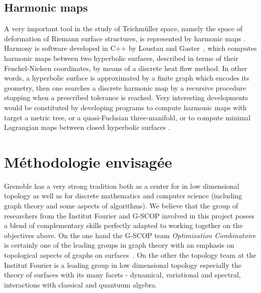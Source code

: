 \documentclass[14pt,fleqn]{article}
\begin{document}
\subsection{Harmonic maps}

A very important tool in the study of Teichm\" {u}ller space, namely the
space of deformation of Riemann surface structures, is represented by
harmonic maps \cite{wolf}. Harmony is  software developed in C++ by
Loustau and Gaster~\cite{glm-cdehm-18}, which computes harmonic maps between two
hyperbolic surfaces, described in terms of their Fenchel-Nielsen
coordinates, by means of a discrete heat flow method. In other words,
a hyperbolic surface is 
approximated by a finite graph 
which encodes its geometry, 
then one searches a discrete harmonic 
map by a  recursive procedure 
stopping when  a prescribed tolerance is reached. 
Very interesting developments would be
constituted by developing programs to compute harmonic maps with
target a metric tree, or a quasi-Fuchsian three-manifold, or to
compute minimal Lagrangian maps between closed hyperbolic surfaces \cite{BS}.


\section{Méthodologie envisagée}

Grenoble  has 
a very strong tradition both 
as a center for in low dimensional topology 
as well as for discrete mathematics and computer science
(including graph theory and some aspects of algorithms). 
We believe that the group of researchers from the Institut Fourier and G-SCOP 
involved
in this project posess a blend of complementary skills 
perfectly adapted
to working together on the objectives above.
On the one hand the G-SCOP team \emph{Optimisation Combinatoire} is certainly one of the leading groups in graph theory with an emphasis on topological aspects of graphs on surfaces~\cite{es-wqpp-18}. On the other the topology team at the Institut Fourier is a leading group in low dimensional topology 
especially the theory of surfaces 
with its many facets 
- dynamical, variational and spectral,
 interactions with classical and quantuum algebra.
 
\end{document}
